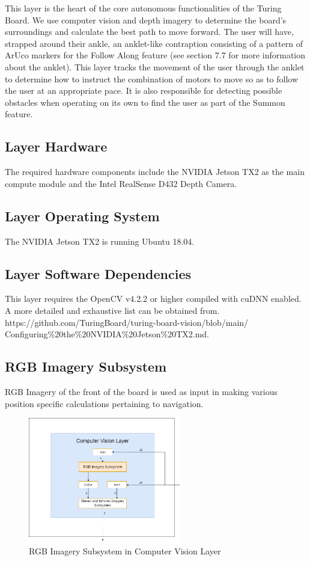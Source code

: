 This layer is the heart of the core autonomous functionalities of the Turing Board. We use computer
vision and depth imagery to determine the board's surroundings and calculate the best path to move
forward. The user will have, strapped around their ankle, an anklet-like contraption consisting of a
pattern of ArUco markers for the Follow Along feature (see section 7.7 for more information about the anklet). This layer tracks the movement of the user
through the anklet to determine how to instruct the combination of motors to move so as to follow the
user at an appropriate pace. It is also responsible for detecting possible obstacles when operating on its
own to find the user as part of the Summon feature.

\subsection{Layer Hardware}
The required hardware components include the NVIDIA Jetson TX2 as the main compute module and the Intel RealSense  D432 Depth Camera.

\subsection{Layer Operating System}
The NVIDIA Jetson TX2 is running Ubuntu 18.04. 

\subsection{Layer Software Dependencies}
This layer requires the OpenCV v4.2.2 or higher compiled with cuDNN enabled. A more detailed and exhaustive list can be obtained from. https://github.com/TuringBoard/turing-board-vision/blob/main/
Configuring\%20the\%20NVIDIA\%20Jetson\%20TX2.md.

\subsection{RGB Imagery Subsystem
}
RGB Imagery of the front of the board is used as input in making various position specific calculations pertaining to navigation.

\begin{figure}[h!]
	\centering
 	\includegraphics[width=0.60\textwidth]{images/CV_RGB.png} %
 \caption{RGB Imagery Subsystem in Computer Vision Layer} %
\end{figure}

